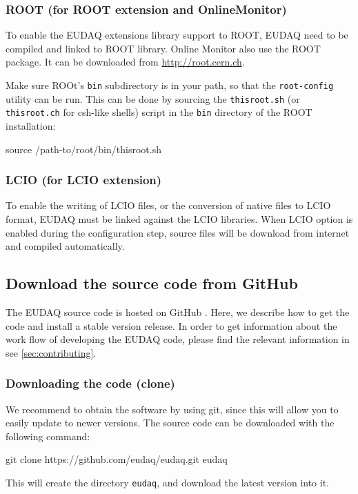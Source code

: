 \subsubsection{ROOT (for ROOT extension and OnlineMonitor)}
\label{sec:Root}
To enable the EUDAQ extensions library support to ROOT, EUDAQ need to be compiled and linked to ROOT library.
Online Monitor also use the ROOT package.
It can be downloaded from \url{http://root.cern.ch}.

Make sure ROOt's \texttt{bin} subdirectory is in your path, so that the \texttt{root-config} utility can be run.
This can be done by sourcing the \texttt{thisroot.sh} (or \texttt{thisroot.ch} for csh-like shells)
script in the \texttt{bin} directory of the ROOT installation:
\begin{listing}[mybash]
source /path-to/root/bin/thisroot.sh
\end{listing}

\subsubsection{LCIO (for LCIO extension)}
\label{sec:LCIO}
To enable the writing of \gls{LCIO} files, or the conversion of native files to \gls{LCIO} format,
EUDAQ must be linked against the \gls{LCIO} libraries.
When LCIO option is enabled during the configuration step, source files will be download from internet and compiled automatically.

\subsection{Download the source code from GitHub}
\label{sec:downloadingEUDAQ}

The EUDAQ source code is hosted on GitHub \cite{githubEUDAQ}. 
Here, we describe how to get the code and install a stable version release. 
In order to get information about the work flow of developing the EUDAQ code, please find the relevant information in see \autoref{sec:contributing}.

\subsubsection{Downloading the code (clone)}
We recommend to obtain the software by using git,
since this will allow you to easily update to newer versions.
The source code can be downloaded with the following command:
\begin{listing}[mybash]
git clone https://github.com/eudaq/eudaq.git eudaq
\end{listing}
This will create the directory \texttt{eudaq}, and download the latest
version into it. 

